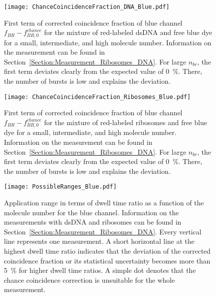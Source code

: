 \vfill
\begin{figure}[h]
	\centering
	\texttt{[image: ChanceCoincidenceFraction\_DNA\_Blue.pdf]}
	\caption[First term of corrected coincidence fraction of blue channel for mixture of red-labeled \gls{dsDNA} and free blue dye]{First term of corrected coincidence fraction of blue channel $f_{BR} - f_{BR,0}^{chance}$ for the mixture of red-labeled \gls{dsDNA} and free blue dye for a small, intermediate, and high molecule number. Information on the measurement can be found in Section~\ref{Section:Measurement_Ribosomes_DNA}. For large $n_{br}$, the first term deviates clearly from the expected value of \SI{0}{\percent}. There, the number of bursts is low and explains the deviation.}
	\label{fig:ChanceCoincidenceFraction_DNA_Blue}
\end{figure}
\vfill

\vfill
\begin{figure}[h]
	\centering
	\texttt{[image: ChanceCoincidenceFraction\_Ribosomes\_Blue.pdf]}
	\caption[First term of corrected coincidence fraction of blue channel for mixture of red-labeled ribosomes and free blue dye]{First term of corrected coincidence fraction of blue channel $f_{BR} - f_{BR,0}^{chance}$ for the mixture of red-labeled ribosomes and free blue dye for a small, intermediate, and high molecule number. Information on the measurement can be found in Section~\ref{Section:Measurement_Ribosomes_DNA}. For large $n_{br}$, the first term deviates clearly from the expected value of \SI{0}{\percent}. There, the number of bursts is low and explains the deviation.}
	\label{fig:ChanceCoincidenceFraction_Ribosomes_Blue}
\end{figure}
\vfill

\vfill
\begin{figure}[h]
	\centering
	\texttt{[image: PossibleRanges\_Blue.pdf]}
	\caption[Application range of chance coincidence correction for blue channel for measurements with \gls{dsDNA} and ribosomes]{Application range in terms of dwell time ratio as a function of the molecule number for the blue channel. Information on the measurements with \gls{dsDNA} and ribosomes can be found in Section~\ref{Section:Measurement_Ribosomes_DNA}. Every vertical line represents one measurement. A short horizontal line at the highest dwell time ratio indicates that the deviation of the corrected coincidence fraction or its statistical uncertainty becomes more than \SI{5}{\percent} for higher dwell time ratios. A simple dot denotes that the chance coincidence correction is unsuitable for the whole measurement.}
	\label{fig:PossibleRanges_Blue}
\end{figure}
\vfill

